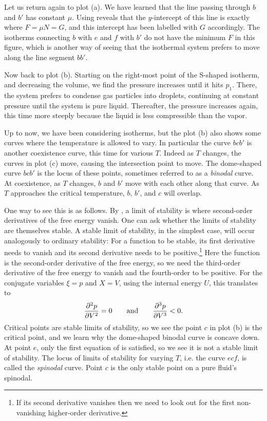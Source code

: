 Let us return again to plot (a). We have learned that the line passing through
$b$ and $b'$ has constant $\mu$. Using  reveals
that the $y$-intercept of this line is exactly where $F=\mu N=G$, and 
this intercept has been labelled
with $G$ accordingly. The isotherms connecting $b$ with $e$ and $f$ with $b'$
do not have the minimum $F$ in this figure, which is another way of seeing
that the isothermal system prefers to move along the line segment $bb'$.

Now back to plot (b). Starting on the right-most point of the S-shaped isotherm,
and decreasing the volume, we find the pressure increases until it hits $p_1$.
There, the system prefers to condense gas particles into droplets, continuing
at constant pressure until the system is pure liquid. Thereafter, the pressure
increases again, this time more steeply because the liquid is less compressible
than the vapor.

Up to now, we have been considering isotherms, but the plot (b) also shows some
curves where the temperature is allowed to vary. In particular the curve
$bcb'$ is another coexistence curve, this time for various $T$. Indeed as $T$
changes, the curves in plot (c) move, causing the intersection point to move.
The dome-shaped curve $bcb'$ is the locus of these points, sometimes referred to
as a {\it binodal} curve. At coexistence, as $T$ changes, $b$
and $b'$ move with each other along that curve. As $T$ approaches the critical
temperature, $b$, $b'$, and $c$ will overlap.

One way to see this is as follows. By , a limit
of stability is where second-order derivatives of the free energy vanish.
One can ask whether the limits of stability are themselves stable. A stable
limit of stability, in the simplest case, will occur analogously to ordinary
stability: For a function to be stable, its first derivative needs to vanish
and its second derivative needs to be positive.\footnote{If its second
derivative vanishes then we need to look out for the first non-vanishing
higher-order derivative.} Here the function is the
second-order derivative of the free energy, so we need the third-order
derivative of the free energy to vanish and the fourth-order to be positive. 
For the conjugate variables $\xi=p$ and $X=V$, using the internal energy $U$,
this translates to
\begin{equation}\label{eq:stablestable}
\pdv[2]{p}{V}=0~~~~~~\text{and}~~~~~~\pdv[3]{p}{V}<0.
\end{equation}
Critical points are stable limits of stability, so we see the point $c$
in plot (b) is the critical point, and we learn why the dome-shaped binodal
curve is concave down. At point $e$, only the first equation of
 is satisfied, so we see it is not a stable limit of
stability. The locus of limits of stability for varying $T$, i.e. the curve
$ecf$, is called the {\it spinodal} curve. Point $c$ is the only
stable point on a pure fluid's spinodal. 


